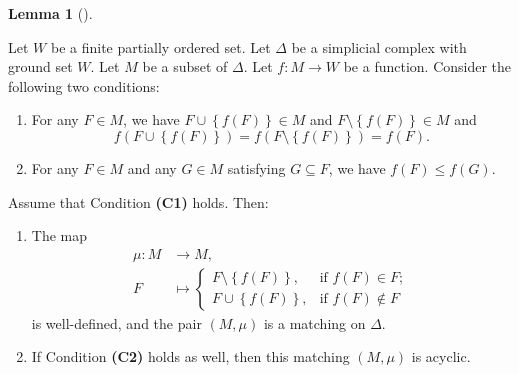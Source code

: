 \documentclass[numbers=enddot,12pt,final,onecolumn,notitlepage]{scrartcl}%
\theoremstyle{definition}
\newtheorem{lem}[theo]{Lemma}
\newenvironment{lemma}[1][]
{\begin{lem}[#1]\begin{leftbar}}
{\end{leftbar}\end{lem}}
\begin{document}
\begin{lemma}
\label{lem.pairing2}Let $W$ be a finite partially ordered set. Let $\Delta$ be
a simplicial complex with ground set $W$. Let $M$ be a subset of $\Delta$. Let
$f:M\rightarrow W$ be a function. Consider the following two conditions:

\begin{enumerate}
\item[\textbf{(C1)}] For any $F\in M$, we have $F\cup\left\{  f\left(
F\right)  \right\}  \in M$ and $F\setminus\left\{  f\left(  F\right)
\right\}  \in M$ and%
\begin{equation}
f\left(  F\cup\left\{  f\left(  F\right)  \right\}  \right)  =f\left(
F\setminus\left\{  f\left(  F\right)  \right\}  \right)  =f\left(  F\right)  .
\label{eq.lem.pairing2.A2}%
\end{equation}


\item[\textbf{(C2)}] For any $F\in M$ and any $G\in M$ satisfying $G\subseteq
F$, we have $f\left(  F\right)  \leq f\left(  G\right)  $.
\end{enumerate}

Assume that Condition \textbf{(C1)} holds. Then:

\begin{enumerate}
\item[\textbf{(a)}] The map
\begin{align*}
\mu:M  &  \rightarrow M,\\
F  &  \mapsto%
\begin{cases}
F\setminus\left\{  f\left(  F\right)  \right\}  , & \text{if }f\left(
F\right)  \in F;\\
F\cup\left\{  f\left(  F\right)  \right\}  , & \text{if }f\left(  F\right)
\notin F
\end{cases}
\end{align*}
is well-defined, and the pair $\left( M, \mu\right) $ is a matching on
$\Delta$.

\item[\textbf{(b)}] If Condition \textbf{(C2)} holds as well, then this
matching $\left(  M,\mu\right)  $ is acyclic.
\end{enumerate}
\end{lemma}
\end{document}
